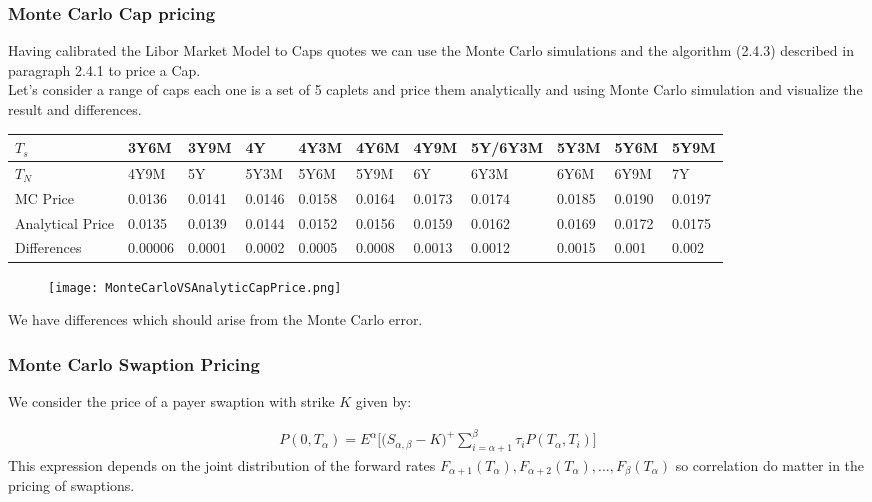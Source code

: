 \documentclass[11pt]{article}
\numberwithin{equation}{subsection}
\begin{document}
\subsubsection{Monte Carlo Cap pricing}
Having calibrated the Libor Market Model to Caps quotes we can use the Monte Carlo simulations and the algorithm (2.4.3) described in paragraph 2.4.1 to price a Cap.\\
Let's consider a range of caps each one is a set of 5 caplets
and price them analytically and using Monte Carlo simulation and visualize the result and differences.
\vskip 0.2cm 		
{
	\begin{center}
		\begin{tabular}{|l|l|l|l|l|l|l|l|l|l|l|}
			\hline
			\(T_{s}\) & 3Y6M & 3Y9M & 4Y & 4Y3M & 4Y6M & 4Y9M & 5Y/6Y3M & 5Y3M & 5Y6M & 5Y9M \\
			\hline 
			\(T_{N}\) & 4Y9M & 5Y & 5Y3M & 5Y6M & 5Y9M & 6Y & 6Y3M & 6Y6M & 6Y9M & 7Y \\
			\hline
			MC Price & 0.0136 & 0.0141 & 0.0146 & 0.0158 & 0.0164 & 0.0173 & 0.0174 & 0.0185 & 0.0190 & 0.0197 \\
			\hline
			Analytical Price & 0.0135 & 0.0139 & 0.0144 & 0.0152 & 0.0156 & 0.0159 & 0.0162 & 0.0169 & 0.0172 & 0.0175 \\
			\hline
			Differences & 0.00006 & 0.0001 & 0.0002 & 0.0005 & 0.0008 & 0.0013 & 0.0012 & 0.0015 & 0.001 & 0.002	\\
			\hline
		\end{tabular}
	\end{center}
}
\vskip 0.4cm
\begin{figure}[H]
	\texttt{[image: MonteCarloVSAnalyticCapPrice.png]}
\end{figure}
We have differences which should arise from the Monte Carlo error.
\newpage
\subsubsection{Monte Carlo Swaption Pricing}
We consider the price of a payer swaption with strike \(K\) given by:

\begin{eqnarray*}
	P(0, T_{\alpha}) = E^{\alpha} \bigg[ \big(S_{\alpha, \beta}-K\big)^{+} \sum_{i=\alpha+1}^{\beta} \tau_{i} P(T_{\alpha}, T_{i})\bigg]
\end{eqnarray*}
This expression depends on the joint distribution of the forward rates \(F_{\alpha+1}(T_{\alpha}), F_{\alpha+2}(T_{\alpha}),...,F_{\beta}(T_{\alpha})\)
so correlation do matter in the pricing of swaptions. 
\end{document}

